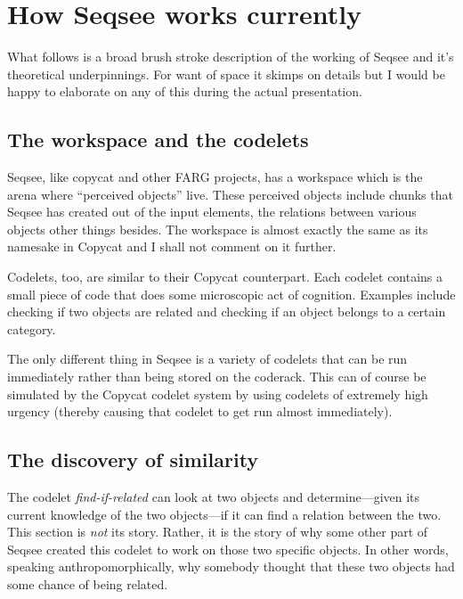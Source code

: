 %

\section{How Seqsee works currently}
\label{sec:how}

What follows is a broad brush stroke description of the working of Seqsee and it's theoretical underpinnings.  For want of space it skimps on details but I would be happy to elaborate on any of this during the actual presentation.

\subsection{The workspace and the codelets}

Seqsee, like copycat and other FARG projects, has a workspace which is the arena where ``perceived objects'' live.  These perceived objects include chunks that Seqsee has created out of the input elements, the relations between various objects other things besides.  The workspace is almost exactly the same as its namesake in Copycat and I shall not comment on it further.

Codelets, too, are similar to their Copycat counterpart. Each codelet contains a small piece of code that does some microscopic act of cognition.  Examples include checking if two objects are related and checking if an object belongs to a certain category.

The only different thing in Seqsee is a variety of codelets that can be run immediately rather than being stored on the coderack.  This can of course be simulated by the Copycat codelet system by using codelets of extremely high urgency (thereby causing that codelet to get run almost immediately).

\subsection{The discovery of similarity}

The codelet \emph{find-if-related} can look at two objects and determine---given its current knowledge of the two objects---if it can find a relation between the two.  This section is \emph{not} its story.  Rather, it is the story of why some other part of Seqsee created this codelet to work on those two specific objects.  In other words, speaking anthropomorphically, why somebody thought that these two objects had some chance of being related.

